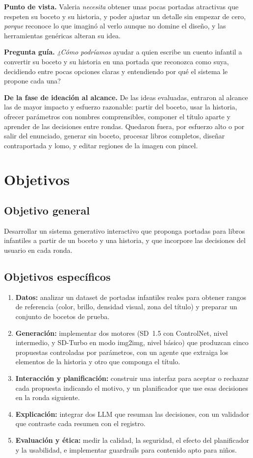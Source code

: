 \documentclass[10pt,a4paper,twocolumn]{article}
\begin{document}
\textbf{Punto de vista.} Valeria \emph{necesita} obtener unas pocas portadas atractivas que respeten su boceto y su historia, y poder ajustar un detalle sin empezar de cero, \emph{porque} reconoce lo que imaginó al verlo aunque no domine el diseño, y las herramientas genéricas alteran su idea.

\textbf{Pregunta guía.} \emph{¿Cómo podríamos} ayudar a quien escribe un cuento infantil a convertir su boceto y su historia en una portada que reconozca como suya, decidiendo entre pocas opciones claras y entendiendo por qué el sistema le propone cada una?

\textbf{De la fase de ideación al alcance.} De las ideas evaluadas, entraron al alcance las de mayor impacto y esfuerzo razonable: partir del boceto, usar la historia, ofrecer parámetros con nombres comprensibles, componer el título aparte y aprender de las decisiones entre rondas. Quedaron fuera, por esfuerzo alto o por salir del enunciado, generar sin boceto, procesar libros completos, diseñar contraportada y lomo, y editar regiones de la imagen con pincel.
\section{Objetivos}
\subsection{Objetivo general}
Desarrollar un sistema generativo interactivo que proponga portadas para libros infantiles a partir de un boceto y una historia, y que incorpore las decisiones del usuario en cada ronda.

\subsection{Objetivos específicos}
\begin{enumerate}
\item \textbf{Datos:} analizar un dataset de portadas infantiles reales para obtener rangos de referencia (color, brillo, densidad visual, zona del título) y preparar un conjunto de bocetos de prueba.
\item \textbf{Generación:} implementar dos motores (SD~1.5 con ControlNet, nivel intermedio, y SD-Turbo en modo img2img, nivel básico) que produzcan cinco propuestas controladas por parámetros, con un agente que extraiga los elementos de la historia y otro que componga el título.
\item \textbf{Interacción y planificación:} construir una interfaz para aceptar o rechazar cada propuesta indicando el motivo, y un planificador que use esas decisiones en la ronda siguiente.
\item \textbf{Explicación:} integrar dos LLM que resuman las decisiones, con un validador que contraste cada resumen con el registro.
\item \textbf{Evaluación y ética:} medir la calidad, la seguridad, el efecto del planificador y la usabilidad, e implementar guardrails para contenido apto para niños.
\end{enumerate}
\end{document}
